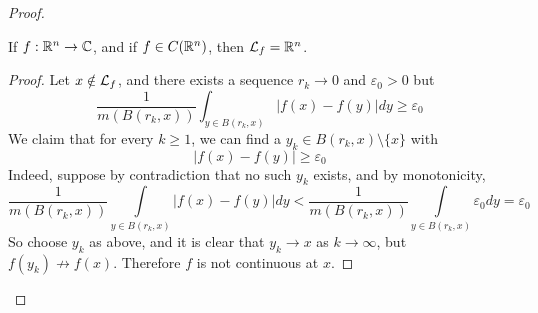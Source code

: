 \documentclass[../../main.tex]{subfiles}
\begin{document}
\begin{proof}
\begin{lemma}\label{lemma:lebesgue set continuity}
    If $f:\mathbb{R}^n\to\mathbb{C}$, and if $f\in C(\mathbb{R}^n)$, then $\mathcal{L}_f=\mathbb{R}^n$.
\end{lemma}
\begin{proof}
    Let $x\notin\mathcal{L}_f$, and there exists a sequence $r_k\to 0$ and $\varepsilon_0>0$ but \[\dfrac{1}{m(B(r_k,x))}\int_{y\in B(r_k,x)}|f(x)-f(y)|dy\geq \varepsilon_0\]
    We claim that for every $k\geq 1$, we can find a $y_k\in B(r_k,x)\setminus\{x\}$ with\[|f(x)-f(y)|\geq\varepsilon_0\]
    Indeed, suppose by contradiction that no such $y_k$ exists, and by monotonicity, \[\dfrac{1}{m(B(r_k,x))}\int\limits_{y\in B(r_k,x)}|f(x)-f(y)|dy<\dfrac{1}{m(B(r_k,x))}\int\limits_{y\in B(r_k,x)}\varepsilon_0dy=\varepsilon_0\]
    So choose $y_k$ as above, and it is clear that $y_k\to x$ as $k\to\infty$, but $f(y_k)\not\to f(x)$. Therefore $f$ is not continuous at $x$.
\end{proof}


\end{proof}
\end{document}
